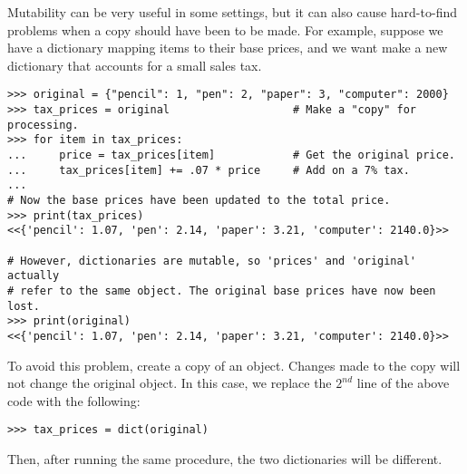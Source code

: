 \begin{warn} %
Mutability can be very useful in some settings, but it can also cause hard-to-find problems when a copy should have been to be made.
For example, suppose we have a dictionary mapping items to their base prices, and we want make a new dictionary that accounts for a small sales tax.

\begin{lstlisting}
>>> original = {"pencil": 1, "pen": 2, "paper": 3, "computer": 2000}
>>> tax_prices = original                   # Make a "copy" for processing.
>>> for item in tax_prices:
...     price = tax_prices[item]            # Get the original price.
...     tax_prices[item] += .07 * price     # Add on a 7% tax.
...
# Now the base prices have been updated to the total price.
>>> print(tax_prices)
<<{'pencil': 1.07, 'pen': 2.14, 'paper': 3.21, 'computer': 2140.0}>>

# However, dictionaries are mutable, so 'prices' and 'original' actually
# refer to the same object. The original base prices have now been lost.
>>> print(original)
<<{'pencil': 1.07, 'pen': 2.14, 'paper': 3.21, 'computer': 2140.0}>>
\end{lstlisting}

To avoid this problem, create a copy of an object.
Changes made to the copy will not change the original object.
In this case, we replace the $2^{nd}$ line of the above code with the following:
\begin{lstlisting}
>>> tax_prices = dict(original)
\end{lstlisting}
Then, after running the same procedure, the two dictionaries will be different.
\end{warn}

